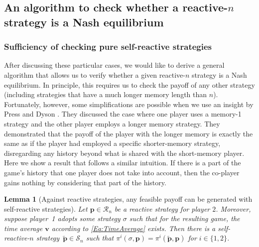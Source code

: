 \documentclass[9pt,twoside,lineno]{pnas-new}
\theoremstyle{plainCl1}
\newtheorem{lemma}{Lemma}
\theoremstyle{plainCl2}
\begin{document}

\subsection{An algorithm to check whether a reactive-$n$ strategy is a Nash equilibrium}
\label{Sec:Algorithm}

\subsubsection*{Sufficiency of checking pure self-reactive strategies}
After discussing these particular cases, we would like to derive a general algorithm that allows us to verify whether a given reactive-$n$ strategy is a Nash equilibrium. 
In principle, this requires us to check the payoff of any other strategy (including strategies that have a much longer memory length than $n$). Fortunately, however, some simplifications are possible when we use an insight by Press and Dyson \cite{press:PNAS:2012}.
They discussed the case where one player uses a memory-1
strategy and the other player employs a longer memory strategy. They
demonstrated that the payoff of the player with the longer memory is exactly the
same as if the player had employed a specific shorter-memory strategy,
disregarding any history beyond what is shared with the short-memory player.
Here we show a result that follows a similar intuition. 
If there is a part of the game's history that one player does not take into account, then the co-player gains nothing by
considering that part of the history. 

\begin{lemma}[Against reactive strategies, any feasible payoff can be generated with self-reactive strategies] \label{lemma:self_reactive_sufficiency}
 Let $\mathbf{p}\!\in\!\mathcal{R}_n$ be a reactive strategy for player $2$. 
 Moreover, suppose player~1 adopts some strategy $\sigma$ such that for the resulting game, the time average $\mathbf{v}$ according to \eqref{Eq:TimeAverage} exists. 
 Then there is a self-reactive-$n$ strategy~$\mathbf{\tilde p}\!\in\!\mathcal{S}_n$ such that $\pi^i(\sigma, \mathbf{p})\! = \!\pi^i(\mathbf{\tilde{p}}, \mathbf{p})$ for $i\!\in\!\{1,2\}$.
\end{lemma}
\end{document}
